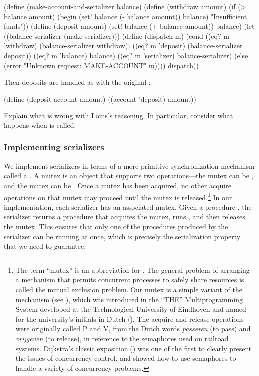 \begin{exerciseGroup}
\begin{compactCodeBlock}
(define (make-account-and-serializer balance)
  (define (withdraw amount)
    (if (>= balance amount)
        (begin (set! balance (- balance amount)) balance)
        "Insufficient funds"))
  (define (deposit amount)
    (set! balance (+ balance amount)) balance)
  (let ((balance-serializer (make-serializer)))
    (define (dispatch m)
      (cond ((eq? m 'withdraw) (balance-serializer withdraw))
            ((eq? m 'deposit) (balance-serializer deposit))
            ((eq? m 'balance) balance)
            ((eq? m 'serializer) balance-serializer)
            (else (error "Unknown request: MAKE-ACCOUNT" m))))
    dispatch))
\end{compactCodeBlock}

Then deposits are handled as with the original :

\begin{codeBlock}
(define (deposit account amount)
  ((account 'deposit) amount))
\end{codeBlock}

Explain what is wrong with Louis's reasoning.  In particular, consider what
happens when  is called.
\end{exerciseGroup}

\subsubsection*{Implementing serializers}

We implement serializers in terms of a more primitive synchronization mechanism
called a .  A mutex is an object that supports two
operations---the mutex can be , and the mutex can be
.  Once a mutex has been acquired, no other acquire
operations on that mutex may proceed until the mutex is released.\footnote{The
term ``mutex'' is an abbreviation for .  The general
problem of arranging a mechanism that permits concurrent processes to safely
share resources is called the mutual exclusion problem.  Our mutex is a simple
variant of the  mechanism (see ), which
was introduced in the ``THE'' Multiprogramming System developed at the
Technological University of Eindhoven and named for the university's initials
in Dutch ().  The acquire and release operations were originally
called P and V, from the Dutch words \emph{passeren} (to pass) and
\emph{vrijgeven} (to release), in reference to the semaphores used on railroad
systems.  Dijkstra's classic exposition () was one of the first to clearly
present the issues of concurrency control, and showed how to use semaphores to
handle a variety of concurrency problems.} In our implementation, each
serializer has an associated mutex.  Given a procedure , the serializer
returns a procedure that acquires the mutex, runs , and then releases
the mutex.  This ensures that only one of the procedures produced by the
serializer can be running at once, which is precisely the serialization
property that we need to guarantee.

